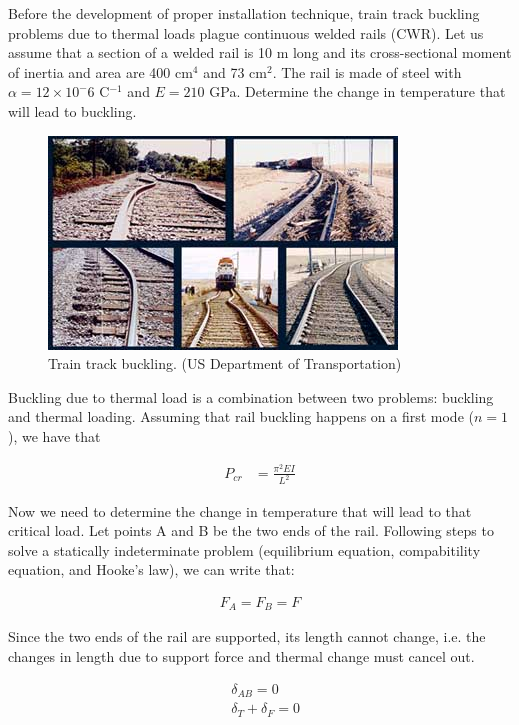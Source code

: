 \documentclass[
fontsize=10pt,
a4paper,
twosides=false,
open=any,
svgnames,
]{kaobook} %
\begin{document}
\begin{example}
  Before the development of proper installation technique, train track buckling problems due to thermal loads plague continuous welded rails (CWR). Let us assume that a section of a welded rail is 10 m long and its cross-sectional moment of inertia and area are 400 cm$^4$ and 73 cm$^2$. The rail is made of steel with $\alpha = 12 \times 10^-6$ C$^{-1}$ and $E = 210$ GPa. Determine the change in temperature that will lead to buckling.

  \begin{figure}[H]
    \centering
    \includegraphics[scale=0.7]{pictures/Failure-theories/Rail_buckle}
    \caption{Train track buckling. (US Department of Transportation)}
  \end{figure}

  Buckling due to thermal load is a combination between two problems: buckling and thermal loading. Assuming that rail buckling happens on a first mode ($n = 1$), we have that

  \begin{align*}
    P_{cr} &= \frac{ \pi^2 EI }{ L^2 } 
  \end{align*}

  Now we need to determine the change in temperature that will lead to that critical load. Let points A and B be the two ends of the rail. Following steps to solve a statically indeterminate problem (equilibrium equation, compabitility equation, and Hooke's law), we can write that:

  \begin{align*}
    F_A = F_B = F
  \end{align*}

  Since the two ends of the rail are supported, its length cannot change, i.e. the changes in length due to support force and thermal change must cancel out.

  \begin{align*}
    &\delta_{AB} = 0 \\
    &\delta_T + \delta_F = 0
  \end{align*}


\end{example}
\end{document}
